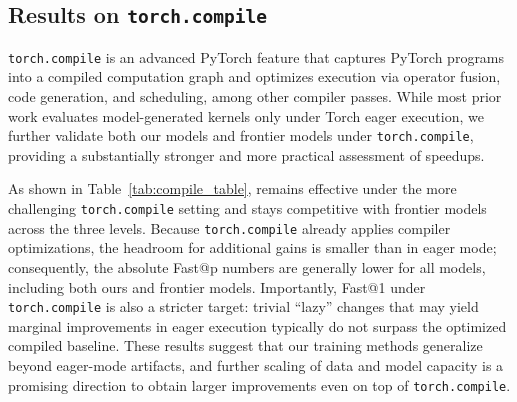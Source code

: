 \subsection{Results on \texttt{torch.compile}}
\texttt{torch.compile} is an advanced PyTorch feature that captures PyTorch programs into a compiled computation graph and optimizes execution via operator fusion, code generation, and scheduling, among other compiler passes. While most prior work evaluates model-generated kernels only under Torch eager execution, we further validate both our models and frontier models under \texttt{torch.compile}, providing a substantially stronger and more practical assessment of speedups.

As shown in Table~\ref{tab:compile_table},  remains effective under the more challenging \texttt{torch.compile} setting and stays competitive with frontier models across the three levels. Because \texttt{torch.compile} already applies compiler optimizations, the headroom for additional gains is smaller than in eager mode; consequently, the absolute Fast@p numbers are generally lower for all models, including both ours and frontier models. Importantly, Fast@1 under \texttt{torch.compile} is also a stricter target: trivial ``lazy'' changes that may yield marginal improvements in eager execution typically do not surpass the optimized compiled baseline. These results suggest that our training methods generalize beyond eager-mode artifacts, and further scaling of data and model capacity is a promising direction to obtain larger improvements even on top of \texttt{torch.compile}.
